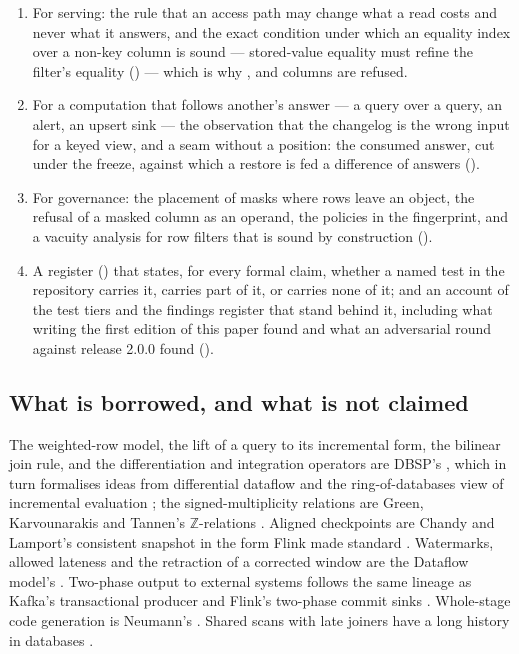 \documentclass[11pt,a4paper]{article}
\renewcommand{\_}{\oldunderscore\allowbreak}
\newcommand{\Z}{\mathbb{Z}}
\newcommand{\code}[1]{\texttt{\pvbreakable{#1}}}
\begin{document}
\begin{enumerate}[leftmargin=*,itemsep=3pt]
      ().
\item For serving: the rule that an access path may change what a read costs and never what it
      answers, and the exact condition under which an equality index over a non-key column is sound
      --- stored-value equality must refine the filter's equality () --- which
      is why \code{FLOAT}, \code{DECIMAL} and \code{BYTES} columns are refused.
\item For a computation that follows another's answer --- a query over a query, an alert, an upsert
      sink --- the observation that the changelog is the wrong input for a keyed view, and a seam
      without a position: the consumed answer, cut under the freeze, against which a restore is fed a
      difference of answers ().
\item For governance: the placement of masks where rows leave an object, the refusal of a masked column
      as an operand, the policies in the fingerprint, and a vacuity analysis for row filters that is
      sound by construction ().
\item A register () that states, for every formal claim, whether a named test in
      the repository carries it, carries part of it, or carries none of it; and an account of the test
      tiers and the findings register that stand behind it, including what writing the first edition of
      this paper found and what an adversarial round against release 2.0.0 found ().
\end{enumerate}

\subsection{What is borrowed, and what is not claimed}

The weighted-row model, the lift of a query to its incremental form, the bilinear join rule, and the
differentiation and integration operators are DBSP's \cite{dbsp2023}, which in turn formalises ideas
from differential dataflow \cite{mcsherry2013} and the ring-of-databases view of incremental
evaluation \cite{koch2010}; the signed-multiplicity relations are Green, Karvounarakis and Tannen's
$\Z$-relations \cite{green2007,green2009}. Aligned checkpoints are Chandy and Lamport's consistent
snapshot \cite{chandy1985} in the form Flink made standard \cite{carbone2015abs,carbone2017}.
Watermarks, allowed lateness and the retraction of a corrected window are the Dataflow model's
\cite{akidau2013,akidau2015}. Two-phase output to external systems follows the same lineage as
Kafka's transactional producer and Flink's two-phase commit sinks \cite{wang2021}. Whole-stage code
generation is Neumann's \cite{neumann2011}. Shared scans with late joiners have a long history in
databases \cite{harizopoulos2005,zukowski2007}.
\end{document}

